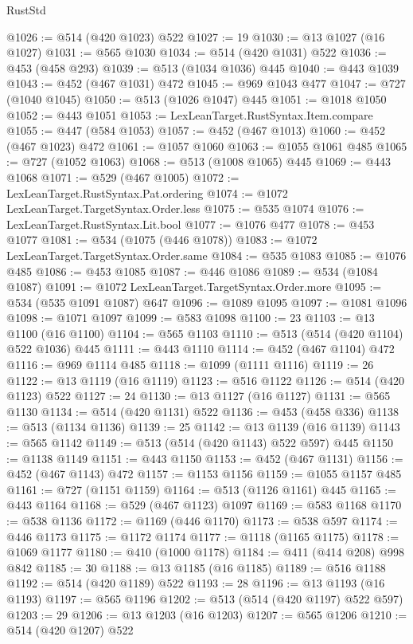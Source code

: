 \begin{lexlean}{RustStd}
\begin{coremodule}
{\begin{coremodule}
{{{{{{{{{{{@1026 := @514 (@420 @1023) @522
@1027 := 19
@1030 := @13 @1027 (@16 @1027)
@1031 := @565 @1030
@1034 := @514 (@420 @1031) @522
@1036 := @453 (@458 @293)
@1039 := @513 (@1034 @1036) @445
@1040 := @443 @1039
@1043 := @452 (@467 @1031) @472
@1045 := @969 @1043 @477
@1047 := @727 (@1040 @1045)
@1050 := @513 (@1026 @1047) @445
@1051 := @1018 @1050
@1052 := @443 @1051
@1053 := LexLeanTarget.RustSyntax.Item.compare
@1055 := @447 (@584 @1053)
@1057 := @452 (@467 @1013)
@1060 := @452 (@467 @1023) @472
@1061 := @1057 @1060
@1063 := @1055 @1061 @485
@1065 := @727 (@1052 @1063)
@1068 := @513 (@1008 @1065) @445
@1069 := @443 @1068
@1071 := @529 (@467 @1005)
@1072 := LexLeanTarget.RustSyntax.Pat.ordering
@1074 := @1072 LexLeanTarget.TargetSyntax.Order.less
@1075 := @535 @1074
@1076 := LexLeanTarget.RustSyntax.Lit.bool
@1077 := @1076 @477
@1078 := @453 @1077
@1081 := @534 (@1075 (@446 @1078))
@1083 := @1072 LexLeanTarget.TargetSyntax.Order.same
@1084 := @535 @1083
@1085 := @1076 @485
@1086 := @453 @1085
@1087 := @446 @1086
@1089 := @534 (@1084 @1087)
@1091 := @1072 LexLeanTarget.TargetSyntax.Order.more
@1095 := @534 (@535 @1091 @1087) @647
@1096 := @1089 @1095
@1097 := @1081 @1096
@1098 := @1071 @1097
@1099 := @583 @1098
@1100 := 23
@1103 := @13 @1100 (@16 @1100)
@1104 := @565 @1103
@1110 := @513 (@514 (@420 @1104) @522 @1036) @445
@1111 := @443 @1110
@1114 := @452 (@467 @1104) @472
@1116 := @969 @1114 @485
@1118 := @1099 (@1111 @1116)
@1119 := 26
@1122 := @13 @1119 (@16 @1119)
@1123 := @516 @1122
@1126 := @514 (@420 @1123) @522
@1127 := 24
@1130 := @13 @1127 (@16 @1127)
@1131 := @565 @1130
@1134 := @514 (@420 @1131) @522
@1136 := @453 (@458 @336)
@1138 := @513 (@1134 @1136)
@1139 := 25
@1142 := @13 @1139 (@16 @1139)
@1143 := @565 @1142
@1149 := @513 (@514 (@420 @1143) @522 @597) @445
@1150 := @1138 @1149
@1151 := @443 @1150
@1153 := @452 (@467 @1131)
@1156 := @452 (@467 @1143) @472
@1157 := @1153 @1156
@1159 := @1055 @1157 @485
@1161 := @727 (@1151 @1159)
@1164 := @513 (@1126 @1161) @445
@1165 := @443 @1164
@1168 := @529 (@467 @1123) @1097
@1169 := @583 @1168
@1170 := @538 @1136
@1172 := @1169 (@446 @1170)
@1173 := @538 @597
@1174 := @446 @1173
@1175 := @1172 @1174
@1177 := @1118 (@1165 @1175)
@1178 := @1069 @1177
@1180 := @410 (@1000 @1178)
@1184 := @411 (@414 @208) @998 @842
@1185 := 30
@1188 := @13 @1185 (@16 @1185)
@1189 := @516 @1188
@1192 := @514 (@420 @1189) @522
@1193 := 28
@1196 := @13 @1193 (@16 @1193)
@1197 := @565 @1196
@1202 := @513 (@514 (@420 @1197) @522 @597)
@1203 := 29
@1206 := @13 @1203 (@16 @1203)
@1207 := @565 @1206
@1210 := @514 (@420 @1207) @522
}}}}}}}}}}}
\end{coremodule}}
\end{coremodule}
\end{lexlean}
